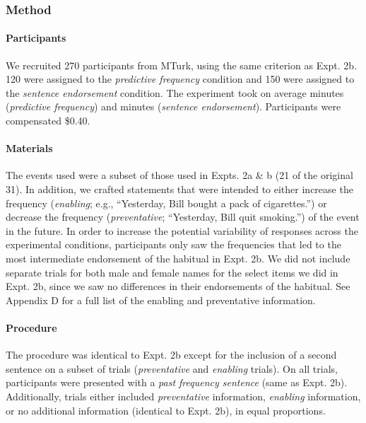 \documentclass[english,floatsintext,man]{apa6}
\theoremstyle{definition}
\theoremstyle{definition}
\theoremstyle{definition}
\theoremstyle{remark}
\begin{document}
\subsubsection{Method}\label{method-4}

\paragraph{Participants}\label{participants-4}

We recruited 270 participants from MTurk, using the same criterion as
Expt. 2b. 120 were assigned to the \emph{predictive frequency} condition
and 150 were assigned to the \emph{sentence endorsement} condition. The
experiment took on average minutes (\emph{predictive frequency}) and
minutes (\emph{sentence endorsement}). Participants were compensated
\$0.40.

\paragraph{Materials}\label{materials-2}

The events used were a subset of those used in Expts. 2a \& b (21 of the
original 31). In addition, we crafted statements that were intended to
either increase the frequency (\emph{enabling}; e.g.,
\enquote{Yesterday, Bill bought a pack of cigarettes.}) or decrease the
frequency (\emph{preventative}; \enquote{Yesterday, Bill quit smoking.})
of the event in the future. In order to increase the potential
variability of responses across the experimental conditions,
participants only saw the frequencies that led to the most intermediate
endorsement of the habitual in Expt. 2b. We did not include separate
trials for both male and female names for the select items we did in
Expt. 2b, since we saw no differences in their endorsements of the
habitual. See Appendix D for a full list of the enabling and
preventative information.

\paragraph{Procedure}\label{procedure-2}

The procedure was identical to Expt. 2b except for the inclusion of a
second sentence on a subset of trials (\emph{preventative} and
\emph{enabling} trials). On all trials, participants were presented with
a \emph{past frequency sentence} (same as Expt. 2b). Additionally,
trials either included \emph{preventative} information, \emph{enabling}
information, or no additional information (identical to Expt. 2b), in
equal proportions.
\end{document}
